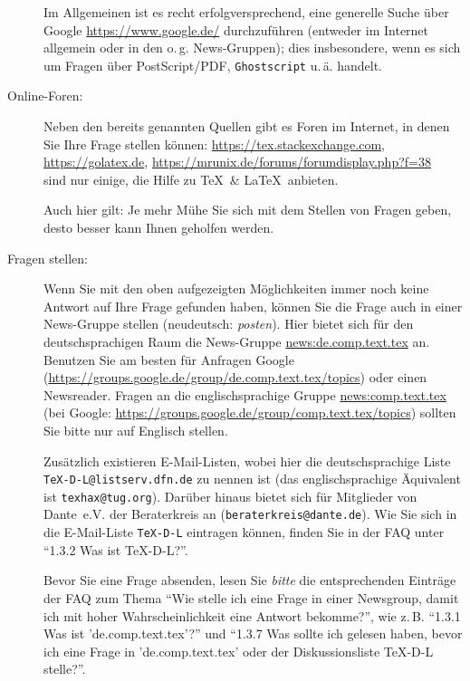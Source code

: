\documentclass[12pt,ngerman,a4paper,fullparskip]{report}
\newcommand{\email}[1]{\texttt{#1}}
\newcommand{\cmdname}[1]{\texttt{#1}}
\newcommand{\dirname}[1]{\texttt{#1}}
\providecommand*{\PS}{Post\-Script\xspace}
\begin{document}
\begin{description}
      Im Allgemeinen ist es recht erfolgversprechend, eine generelle Suche über Google
      \url{https://www.google.de/} durchzuführen (entweder im Internet allgemein
      oder in den o.\,g. News-Gruppen); dies insbesondere, wenn es sich um Fragen über
      \PS/PDF, \cmdname{Ghostscript} u.\,ä. handelt.

\item [Online-Foren:] Neben den bereits genannten Quellen gibt es Foren im Internet, in denen Sie Ihre Frage stellen können: \url{https://tex.stackexchange.com}, \url{https://golatex.de}, \url{https://mrunix.de/forums/forumdisplay.php?f=38} \\ sind nur einige, die Hilfe zu \TeX\ \& \LaTeX\ anbieten.

Auch hier gilt: Je mehr Mühe Sie sich mit dem Stellen von Fragen geben, desto besser kann Ihnen geholfen werden.

\item [Fragen stellen:]
      Wenn Sie mit den oben aufgezeigten Möglichkeiten immer noch keine Antwort auf Ihre Frage gefunden haben, können Sie die Frage auch in einer News-Gruppe stellen (neudeutsch: \emph{posten}). Hier bietet sich für den deutschsprachigen Raum die News-Gruppe \url{news:de.comp.text.tex} an. 
      Benutzen Sie am besten für Anfragen Google 
      (\url{https://groups.google.de/group/de.comp.text.tex/topics})
      oder einen Newsreader. Fragen an die englischsprachige Gruppe
      \url{news:comp.text.tex} 
      (bei Google: \url{https://groups.google.de/group/comp.text.tex/topics}) 
      sollten Sie bitte nur auf Englisch stellen.

      Zusätzlich existieren E-Mail-Listen, wobei hier die deutschsprachige Liste
      \email{TeX-D-L@listserv.dfn.de} zu nennen ist (das englischsprachige Äquivalent 
      ist \email{texhax@tug.org}). Darüber hinaus bietet sich für Mitglieder
      von Dante~e.V. der Beraterkreis an (\email{beraterkreis@dante.de}).
      Wie Sie sich in die E-Mail-Liste \dirname{TeX-D-L} eintragen können,
      finden Sie in der FAQ unter \enquote{1.3.2 Was ist TeX-D-L?}.

      Bevor Sie eine Frage absenden, lesen Sie \emph{bitte} die entsprechenden
      Einträge der FAQ zum Thema \enquote{Wie stelle ich eine Frage in einer
      Newsgroup, damit ich mit hoher Wahrscheinlichkeit eine Antwort bekomme?}, wie 
      z.\,B. \enquote{1.3.1 Was ist 'de.comp.text.tex'?}  und \enquote{1.3.7 Was
      sollte ich gelesen haben, bevor ich eine Frage in 'de.comp.text.tex' oder der
      Diskussionsliste TeX-D-L stelle?}.


\end{description}
\end{document}
